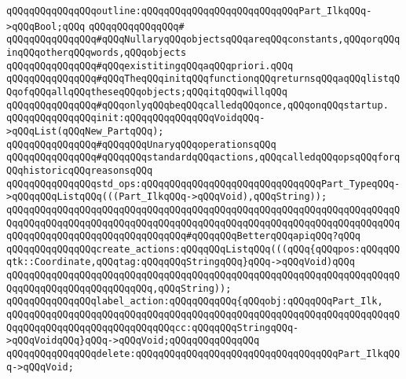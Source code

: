 \newline
\verb|qQQqqQQqqQQqqQQqoutline:qQQqqQQqqQQqqQQqqQQqqQQqqQQqPart_IlkqQQq->qQQqBool;qQQq|\newline
\newline
\verb|qQQqqQQqqQQqqQQq#|\newline
\verb|qQQqqQQqqQQqqQQq#qQQqNullaryqQQqobjectsqQQqareqQQqconstants,qQQqorqQQqinqQQqotherqQQqwords,qQQqobjects|\newline
\verb|qQQqqQQqqQQqqQQq#qQQqexistitingqQQqaqQQqpriori.qQQq|\newline
\verb|qQQqqQQqqQQqqQQq#qQQqTheqQQqinitqQQqfunctionqQQqreturnsqQQqaqQQqlistqQQqofqQQqallqQQqtheseqQQqobjects;qQQqitqQQqwillqQQq|\newline
\verb|qQQqqQQqqQQqqQQq#qQQqonlyqQQqbeqQQqcalledqQQqonce,qQQqonqQQqstartup.|\newline
\newline
\verb|qQQqqQQqqQQqqQQqinit:qQQqqQQqqQQqqQQqVoidqQQq->qQQqList(qQQqNew_PartqQQq);|\newline
\newline
\verb|qQQqqQQqqQQqqQQq#qQQqqQQqUnaryqQQqoperationsqQQq|\newline
\newline
\verb|qQQqqQQqqQQqqQQq#qQQqqQQqstandardqQQqactions,qQQqcalledqQQqopsqQQqforqQQqhistoricqQQqreasonsqQQq|\newline
\verb|qQQqqQQqqQQqqQQqstd_ops:qQQqqQQqqQQqqQQqqQQqqQQqqQQqqQQqPart_TypeqQQq->qQQqqQQqListqQQq(((Part_IlkqQQq->qQQqVoid),qQQqString));|\newline
\verb|qQQqqQQqqQQqqQQqqQQqqQQqqQQqqQQqqQQqqQQqqQQqqQQqqQQqqQQqqQQqqQQqqQQqqQQqqQQqqQQqqQQqqQQqqQQqqQQqqQQqqQQqqQQqqQQqqQQqqQQqqQQqqQQqqQQqqQQqqQQqqQQqqQQqqQQqqQQqqQQqqQQqqQQqqQQq#qQQqqQQqBetterqQQqapiqQQq?qQQq|\newline
\verb|qQQqqQQqqQQqqQQqcreate_actions:qQQqqQQqListqQQq(((qQQq{qQQqpos:qQQqqQQqtk::Coordinate,qQQqtag:qQQqqQQqStringqQQq}qQQq->qQQqVoid)qQQq|\newline
\verb|qQQqqQQqqQQqqQQqqQQqqQQqqQQqqQQqqQQqqQQqqQQqqQQqqQQqqQQqqQQqqQQqqQQqqQQqqQQqqQQqqQQqqQQqqQQqqQQq,qQQqString));|\newline
\verb|qQQqqQQqqQQqqQQqlabel_action:qQQqqQQqqQQq{qQQqobj:qQQqqQQqPart_Ilk,|\newline
\verb|qQQqqQQqqQQqqQQqqQQqqQQqqQQqqQQqqQQqqQQqqQQqqQQqqQQqqQQqqQQqqQQqqQQqqQQqqQQqqQQqqQQqqQQqqQQqqQQqqQQqcc:qQQqqQQqStringqQQq->qQQqVoidqQQq}qQQq->qQQqVoid;qQQqqQQqqQQqqQQq|\newline
\verb|qQQqqQQqqQQqqQQqdelete:qQQqqQQqqQQqqQQqqQQqqQQqqQQqqQQqqQQqPart_IlkqQQq->qQQqVoid;|\newline
